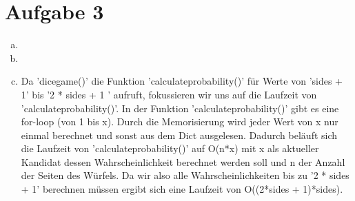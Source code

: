 \documentclass[a4paper,12pt]{scrartcl}
\begin{document}
\section*{Aufgabe 3}
\begin{enumerate}[a)]
	\item 
	\item
	\item Da 'dicegame()' die Funktion 'calculateprobability()' für Werte von 'sides + 1' bis '2 * sides + 1 ' aufruft, fokussieren wir uns auf die Laufzeit von 'calculateprobability()'.
    In der Funktion 'calculateprobability()' gibt es eine for-loop (von 1 bis x).
    Durch die Memorisierung wird jeder Wert von x nur einmal berechnet und sonst aus dem Dict ausgelesen.
    Dadurch beläuft sich die Laufzeit von 'calculateprobability()' auf O(n*x) mit x als aktueller Kandidat dessen Wahrscheinlichkeit berechnet werden soll und n der Anzahl der Seiten des Würfels.
    Da wir also alle Wahrscheinlichkeiten bis zu '2 * sides + 1' berechnen müssen ergibt sich eine Laufzeit von O((2*sides + 1)*sides).



 

\end{enumerate}
\end{document}
